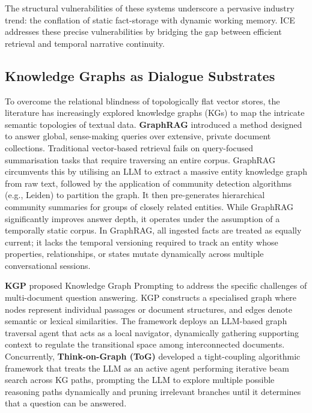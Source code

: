 \documentclass[10pt]{article}
\begin{document}
The structural vulnerabilities of these systems underscore a pervasive industry trend: the conflation of static fact-storage with dynamic working memory. ICE addresses these precise vulnerabilities by bridging the gap between efficient retrieval and temporal narrative continuity.

\subsection{Knowledge Graphs as Dialogue Substrates}

To overcome the relational blindness of topologically flat vector stores, the literature has increasingly explored knowledge graphs (KGs) to map the intricate semantic topologies of textual data. \textbf{GraphRAG} \citep{edge2024graphrag} introduced a method designed to answer global, sense-making queries over extensive, private document collections. Traditional vector-based retrieval fails on query-focused summarisation tasks that require traversing an entire corpus. GraphRAG circumvents this by utilising an LLM to extract a massive entity knowledge graph from raw text, followed by the application of community detection algorithms (e.g., Leiden) to partition the graph. It then pre-generates hierarchical community summaries for groups of closely related entities. While GraphRAG significantly improves answer depth, it operates under the assumption of a temporally static corpus. In GraphRAG, all ingested facts are treated as equally current; it lacks the temporal versioning required to track an entity whose properties, relationships, or states mutate dynamically across multiple conversational sessions.

\textbf{KGP} \citep{wang2023kgp} proposed Knowledge Graph Prompting to address the specific challenges of multi-document question answering. KGP constructs a specialised graph where nodes represent individual passages or document structures, and edges denote semantic or lexical similarities. The framework deploys an LLM-based graph traversal agent that acts as a local navigator, dynamically gathering supporting context to regulate the transitional space among interconnected documents. Concurrently, \textbf{Think-on-Graph (ToG)} \citep{sun2024tog} developed a tight-coupling algorithmic framework that treats the LLM as an active agent performing iterative beam search across KG paths, prompting the LLM to explore multiple possible reasoning paths dynamically and pruning irrelevant branches until it determines that a question can be answered.
\end{document}

